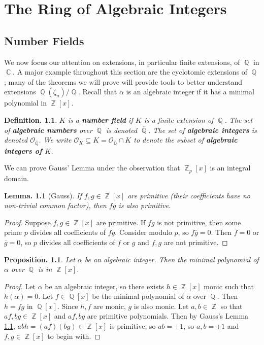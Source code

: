 \documentclass[11pt, a4paper]{memoir}
\DeclareMathOperator{\Q}{{\mathbb{Q}}}
\DeclareMathOperator{\Z}{{\mathbb{Z}}}
\DeclareMathOperator{\C}{{\mathbb{C}}}
\newcommand{\ol}[1]{\ensuremath{\overline{#1}}}
\theoremstyle{change}
\newtheorem{lemma}[theorem]{Lemma.}
\newtheorem{proposition}[theorem]{Proposition.}
\theoremstyle{plain}
\theoremstyle{nonumberplain}
\newtheorem{definition}{Definition.}
\newtheorem{proof}{Proof}
\newcommand{\mbf}[1]{{\boldmath\bfseries #1}}
\numberwithin{equation}{section}
\begin{document}
\chapter{The Ring of Algebraic Integers}
\section{Number Fields}
We now focus our attention on extensions, in particular finite extensions, of $\Q$ in $\C$.
A major example throughout this section are the cyclotomic extensions of $\Q$; many of the theorems we will prove will provide tools to better understand extensions $\Q(\zeta_n)/\Q$.
Recall that $\alpha$ is an algebraic integer if it has a minimal polynomial in $\Z[x]$.
\begin{definition}
    $K$ is a \mbf{number field} if $K$ is a finite extension of $\Q$.
    The set of \mbf{algebraic numbers} over $\Q$ is denoted $\ol{\Q}$.
    The set of \mbf{algebraic integers} is denoted $\mathcal{O}_{\ol{\Q}}$.
    We write $\mathcal{O}_K\subseteq K=\mathcal{O}_{\ol{\Q}}\cap K$ to denote the subset of \mbf{algebraic integers of $K$}.
\end{definition}
We can prove Gauss' Lemma under the observation that $\Z_p[x]$ is an integral domain.
\begin{lemma}[Gauss]\label{l:gauss}
    If $f,g\in\Z[x]$ are primitive (their coefficients have no non-trivial common factor), then $fg$ is also primitive.
\end{lemma}
\begin{proof}
    Suppose $f,g\in\Z[x]$ are primitive.
    If $fg$ is not primitive, then some prime $p$ divides all coefficients of $fg$.
    Consider modulo $p$, so $\ol{f}\ol{g}=0$.
    Then $\ol{f}=0$ or $\ol{g}=0$, so $p$ divides all coefficients of $f$ or $g$ and $f,g$ are not primitive.
\end{proof}
\begin{proposition}\label{p:min-int}
    Let $\alpha$ be an algebraic integer.
    Then the minimal polynomial of $\alpha$ over $\Q$ is in $\Z[x]$.
\end{proposition}
\begin{proof}
    Let $\alpha$ be an algebraic integer, so there exists $h\in\Z[x]$ monic such that $h(\alpha)=0$.
    Let $f\in\Q[x]$ be the minimal polynomial of $\alpha$ over $\Q$.
    Then $h=fg$ in $\Q[x]$.
    Since $h,f$ are monic, $g$ is also monic.
    Let $a,b\in\Z$ so that $af,bg\in\Z[x]$ and $af,bg$ are primitive polynomials.
    Then by Gauss's Lemma \cref{l:gauss}, $abh=(af)(bg)\in\Z[x]$ is primitive, so $ab=\pm1$, so $a,b=\pm1$ and $f,g\in\Z[x]$ to begin with.
\end{proof}
\end{document}
